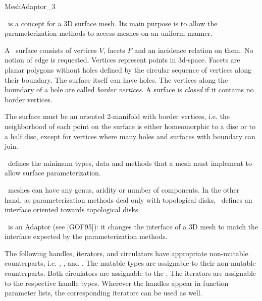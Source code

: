 

\begin{ccRefConcept}{MeshAdaptor_3}



\ccDefinition

\ccRefName\ is a concept for a 3D surface mesh.
Its main purpose is to allow
the parameterization methods to access meshes on an uniform manner.

A \ccRefName\ surface consists of vertices $V$,
facets $F$ and an incidence relation on them.
No notion of edge is requested.
Vertices represent points in 3d-space. Facets are planar polygons without holes
defined by the circular sequence of vertices along their boundary.
The surface itself can have holes. The vertices
along the boundary of a hole are called {\em border vertices\/}.
A surface is {\em closed\/} if it
contains no border vertices.

The surface must be an
oriented 2-manifold with border vertices, i.e.
the neighborhood of each point on the surface is either
homeomorphic to a disc or to a half disc, except for vertices where
many holes and surfaces with boundary can join.

\ccRefName\ defines the minimum types, data and methods that a mesh must implement
to allow surface parameterization.

\ccRefName\ meshes can have any genus, aridity or number of components.
In the other hand,
as parameterization methods deal only with topological disks, \ccRefName\
defines an interface oriented towards topological disks.



\ccRefName\ is an Adaptor (see [GOF95]): it changes the
interface of a 3D mesh to match the interface expected by the parameterization methods.


\ccTypes

The following handles, iterators, and circulators have appropriate
non-mutable counterparts, i.e. \ccc{const_handle},
, and . The mutable types are
assignable to their non-mutable counterparts.  Both circulators are
assignable to the \ccc{Vertex_iterator}. The iterators are
assignable to the respective handle types. Wherever the handles appear
in function parameter lists, the corresponding iterators can be used as
well.


\end{ccRefConcept}

